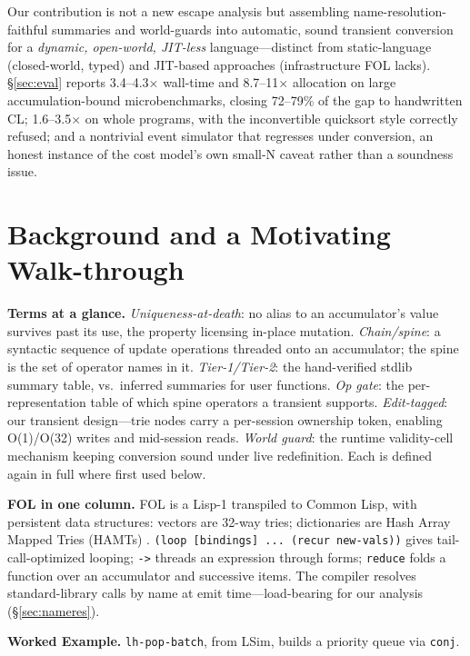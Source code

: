 \documentclass[sigplan,review,anonymous]{acmart}
\begin{document}
Our contribution is not a new escape analysis but assembling name-resolution-faithful summaries and world-guards into automatic, sound transient conversion for a \emph{dynamic, open-world, JIT-less} language---distinct from static-language (closed-world, typed) and JIT-based approaches (infrastructure FOL lacks). §\ref{sec:eval} reports 3.4--4.3$\times$ wall-time and 8.7--11$\times$ allocation on large accumulation-bound microbenchmarks, closing 72--79\% of the gap to handwritten CL; 1.6--3.5$\times$ on whole programs, with the inconvertible quicksort style correctly refused; and a nontrivial event simulator that regresses under conversion, an honest instance of the cost model's own small-N caveat rather than a soundness issue.

\section{Background and a Motivating Walk-through}
\label{sec:background}

\textbf{Terms at a glance.} \emph{Uniqueness-at-death}: no alias to an accumulator's value survives past its use, the property licensing in-place mutation. \emph{Chain/spine}: a syntactic sequence of update operations threaded onto an accumulator; the spine is the set of operator names in it. \emph{Tier-1/Tier-2}: the hand-verified stdlib summary table, vs.\ inferred summaries for user functions. \emph{Op gate}: the per-representation table of which spine operators a transient supports. \emph{Edit-tagged}: our transient design---trie nodes carry a per-session ownership token, enabling O(1)/O(32) writes and mid-session reads. \emph{World guard}: the runtime validity-cell mechanism keeping conversion sound under live redefinition. Each is defined again in full where first used below.

\textbf{FOL in one column.} FOL is a Lisp-1 transpiled to Common Lisp, with persistent data structures: vectors are 32-way tries; dictionaries are Hash Array Mapped Tries (HAMTs) \cite{bagwell2001ideal}. \texttt{(loop [bindings] ... (recur new-vals))} gives tail-call-optimized looping; \texttt{->} threads an expression through forms; \texttt{reduce} folds a function over an accumulator and successive items. The compiler resolves standard-library calls by name at emit time---load-bearing for our analysis (§\ref{sec:nameres}).

\textbf{Worked Example.} \texttt{lh-pop-batch}, from LSim, builds a priority queue via \texttt{conj}.
\end{document}
